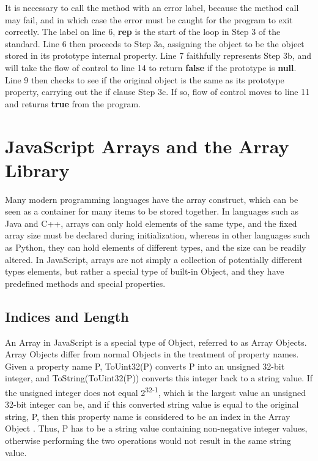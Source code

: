 \documentclass[a4paper,11pt,twoside]{report}
\begin{document}
It is necessary to call the method with an error label, because the method call may fail, and in which case the error must be caught for the program to exit correctly. The label on line 6, \textbf{rep} is the start of the loop in Step 3 of the standard. Line 6 then proceeds to Step 3a, assigning the object to be the object stored in its prototype internal property. Line 7 faithfully represents Step 3b, and will take the flow of control to line 14 to return \textbf{false} if the prototype is \textbf{null}. Line 9 then checks to see if the original object is the same as its prototype property, carrying out the if clause Step 3c. If so, flow of control moves to line 11 and returns \textbf{true} from the program.

\chapter{JavaScript Arrays and the Array Library}
Many modern programming languages have the array construct, which can be seen as a container for many items to be stored together. In languages such as Java and C++, arrays can only hold elements of the same type, and the fixed array size must be declared during initialization, whereas in other languages such as Python, they can hold elements of different types, and the size can be readily altered. In JavaScript, arrays are not simply a collection of potentially different types elements, but rather a special type of built-in Object, and they have predefined methods and special properties. 

\section{Indices and Length}
An Array in JavaScript is a special type of Object, referred to as Array Objects. Array Objects differ from normal Objects in the treatment of property names. Given a property name P, ToUint32(P) converts P into an unsigned 32-bit integer, and ToString(ToUint32(P)) converts this integer back to a string value. If the unsigned integer does not equal 2\textsuperscript{32-1}, which is the largest value an unsigned 32-bit integer can be, and if this converted string value is equal to the original string, P, then this property name is considered to be an index in the Array Object \cite{EcmaScript}. Thus, P has to be a string value containing non-negative integer values, otherwise performing the two operations would not result in the same string value. 
\end{document}
